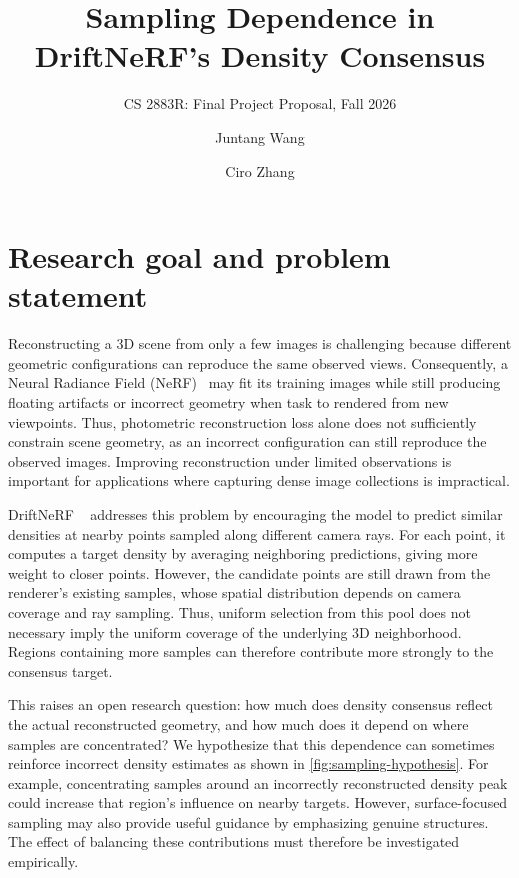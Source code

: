 \documentclass[sigconf,nonacm]{acmart}
\begin{document}
\title{Sampling Dependence in DriftNeRF's Density Consensus}
\subtitle{CS 2883R: Final Project Proposal, Fall 2026}
\author{Juntang Wang}
\author{Ciro Zhang}
\renewcommand{\shortauthors}{Wang and Zhang}

\maketitle
\raggedbottom
\balance

\section{Research goal and problem statement}\label{sec:goal}

Reconstructing a 3D scene from only a few images is challenging because different geometric configurations can reproduce the same observed views. Consequently, a Neural Radiance Field (NeRF)~\citep{mildenhall2020nerf} may fit its training images while still producing floating artifacts or incorrect geometry when task to rendered from new viewpoints. Thus, photometric reconstruction loss alone does not sufficiently constrain scene geometry, as an incorrect configuration can still reproduce the observed images. Improving reconstruction under limited observations is important for applications where capturing dense image collections is impractical.

DriftNeRF ~\citep{wang2026driftnerf}  addresses this problem by encouraging the model to predict similar densities at nearby points sampled along different camera rays. For each point, it computes a target density by averaging neighboring predictions, giving more weight to closer points. However, the candidate points are still drawn from the renderer's existing samples, whose spatial distribution depends on camera coverage and ray sampling. Thus, uniform selection from this pool does not necessary imply the uniform coverage of the underlying 3D neighborhood. Regions containing more samples can therefore contribute more strongly to the consensus target.

This raises an open research question: how much does density consensus reflect the actual reconstructed geometry, and how much does it depend on where samples are concentrated? We hypothesize that this dependence can sometimes reinforce incorrect density estimates as shown in \cref{fig:sampling-hypothesis}. For example, concentrating samples around an incorrectly reconstructed density peak could increase that region's influence on nearby targets. However, surface-focused sampling may also provide useful guidance by emphasizing genuine structures. The effect of balancing these contributions must therefore be investigated empirically.
\end{document}
